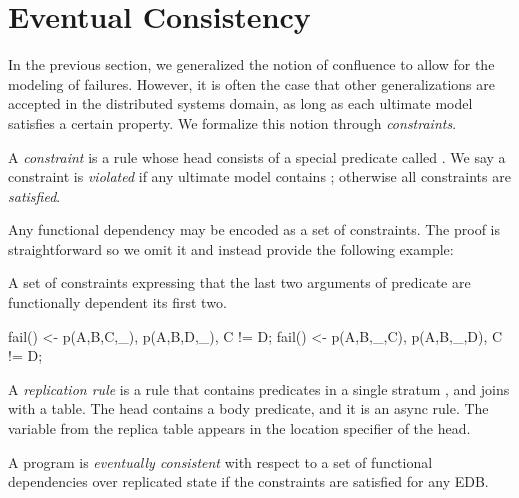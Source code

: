 \section{Eventual Consistency}

In the previous section, we generalized the notion of confluence to allow for the modeling of failures.  However, it is often the case that other generalizations are accepted in the distributed systems domain, as long as each ultimate model satisfies a certain property.  We formalize this notion through {\em constraints}.

\begin{definition}
A {\em constraint} is a rule whose head consists of a special predicate called .  We say a constraint is {\em violated} if any ultimate model contains ; otherwise all constraints are {\em satisfied}.
\end{definition}

Any functional dependency may be encoded as a set of constraints.  The proof is straightforward so we omit it and instead provide the following example:

\begin{example}
A set of constraints expressing that the last two arguments of predicate  are functionally dependent its first two.

\begin{Dedalus}
fail() <- p(A,B,C,_), p(A,B,D,_), C != D;
fail() <- p(A,B,_,C), p(A,B,_,D), C != D;
\end{Dedalus}
\end{example}

\begin{definition}
A {\em replication rule} is a rule that contains predicates in a single stratum , and joins with a  table.  The head contains a body predicate, and it is an async rule.  The variable from the replica table appears in the location specifier of the head.
\end{definition}

\begin{definition}
A \lang program is {\em eventually consistent} with respect to a set of functional dependencies  over replicated state if the constraints are satisfied for any EDB.
\end{definition}


